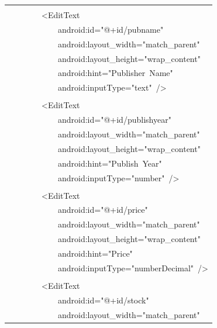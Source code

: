 \documentclass[a4paper,12pt]{article}
\begin{document}
\begin{longtable}{|p{}|}
\strut \\
{\ttfamily\small \ \ \ \ \ \ \ \ \textless{}EditText} \\
{\ttfamily\small \ \ \ \ \ \ \ \ \ \ \ \ android:id="@+id/pubname"} \\
{\ttfamily\small \ \ \ \ \ \ \ \ \ \ \ \ android:layout\_width="match\_parent"} \\
{\ttfamily\small \ \ \ \ \ \ \ \ \ \ \ \ android:layout\_height="wrap\_content"} \\
{\ttfamily\small \ \ \ \ \ \ \ \ \ \ \ \ android:hint="Publisher\ Name"} \\
{\ttfamily\small \ \ \ \ \ \ \ \ \ \ \ \ android:inputType="text"\ /\textgreater{}} \\
\strut \\
{\ttfamily\small \ \ \ \ \ \ \ \ \textless{}EditText} \\
{\ttfamily\small \ \ \ \ \ \ \ \ \ \ \ \ android:id="@+id/publishyear"} \\
{\ttfamily\small \ \ \ \ \ \ \ \ \ \ \ \ android:layout\_width="match\_parent"} \\
{\ttfamily\small \ \ \ \ \ \ \ \ \ \ \ \ android:layout\_height="wrap\_content"} \\
{\ttfamily\small \ \ \ \ \ \ \ \ \ \ \ \ android:hint="Publish\ Year"} \\
{\ttfamily\small \ \ \ \ \ \ \ \ \ \ \ \ android:inputType="number"\ /\textgreater{}} \\
\strut \\
{\ttfamily\small \ \ \ \ \ \ \ \ \textless{}EditText} \\
{\ttfamily\small \ \ \ \ \ \ \ \ \ \ \ \ android:id="@+id/price"} \\
{\ttfamily\small \ \ \ \ \ \ \ \ \ \ \ \ android:layout\_width="match\_parent"} \\
{\ttfamily\small \ \ \ \ \ \ \ \ \ \ \ \ android:layout\_height="wrap\_content"} \\
{\ttfamily\small \ \ \ \ \ \ \ \ \ \ \ \ android:hint="Price"} \\
{\ttfamily\small \ \ \ \ \ \ \ \ \ \ \ \ android:inputType="numberDecimal"\ /\textgreater{}} \\
\strut \\
{\ttfamily\small \ \ \ \ \ \ \ \ \textless{}EditText} \\
{\ttfamily\small \ \ \ \ \ \ \ \ \ \ \ \ android:id="@+id/stock"} \\
{\ttfamily\small \ \ \ \ \ \ \ \ \ \ \ \ android:layout\_width="match\_parent"} \\

\end{longtable}
\end{document}
